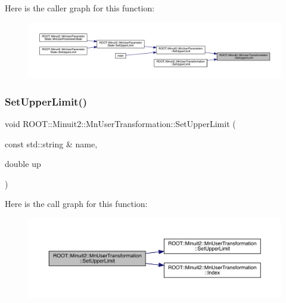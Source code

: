 Here is the caller graph for this function\+:\nopagebreak
\begin{figure}[H]
\begin{center}
\leavevmode
\includegraphics[width=350pt]{d9/d98/classROOT_1_1Minuit2_1_1MnUserTransformation_a276c83d584ef857cd2b69ecc04cfab01_icgraph}
\end{center}
\end{figure}
\mbox{\label{classROOT_1_1Minuit2_1_1MnUserTransformation_aabe0a301a7d6f7fc322afcc4544e1129}} 
\subsubsection{\texorpdfstring{SetUpperLimit()}{SetUpperLimit()}\hspace{0.1cm}{\footnotesize\ttfamily [3/4]}}
{\footnotesize\ttfamily void R\+O\+O\+T\+::\+Minuit2\+::\+Mn\+User\+Transformation\+::\+Set\+Upper\+Limit (\begin{DoxyParamCaption}\item[{const std\+::string \&}]{name,  }\item[{double}]{up }\end{DoxyParamCaption})}

Here is the call graph for this function\+:\nopagebreak
\begin{figure}[H]
\begin{center}
\leavevmode
\includegraphics[width=350pt]{d9/d98/classROOT_1_1Minuit2_1_1MnUserTransformation_aabe0a301a7d6f7fc322afcc4544e1129_cgraph}
\end{center}
\end{figure}
\mbox{\label{classROOT_1_1Minuit2_1_1MnUserTransformation_aabe0a301a7d6f7fc322afcc4544e1129}} 
